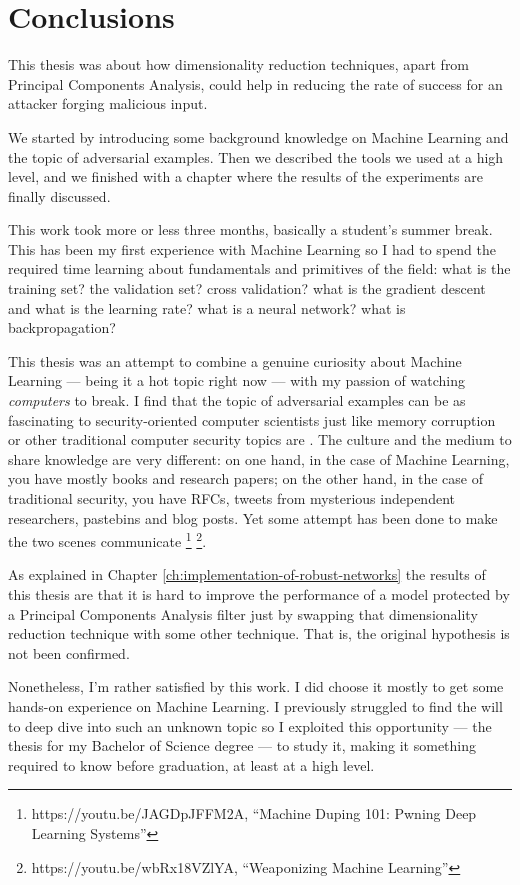 \chapter*{Conclusions}

This thesis was about how dimensionality reduction techniques, apart
from Principal Components Analysis, could help in reducing the rate of
success for an attacker forging malicious input.

We started by introducing some background knowledge on Machine Learning
and the topic of adversarial examples. Then we described the tools we
used at a high level, and we finished with a chapter where the results
of the experiments are finally discussed.

This work took more or less three months, basically a student's summer
break. This has been my first experience with Machine Learning so I had
to spend the required time learning about fundamentals and primitives
of the field: what is the training set? the validation set? cross
validation? what is the gradient descent and what is the learning rate?
what is a neural network? what is backpropagation?

This thesis was an attempt to combine a genuine curiosity about Machine
Learning --- being it a hot topic right now --- with my passion of
watching \emph{computers} to break. I find that the topic of
adversarial examples can be as fascinating to security-oriented
computer scientists just like memory corruption or other traditional
computer security topics are \cite{DBLP:journals/corr/PapernotMSW16}.
The culture and the medium to share knowledge are very different: on
one hand, in the case of Machine Learning, you have mostly books and
research papers; on the other hand, in the case of traditional
security, you have RFCs, tweets from mysterious independent
researchers, pastebins and blog posts. Yet some attempt has been done
to make the two scenes communicate%
\footnote{https://youtu.be/JAGDpJFFM2A, ``Machine Duping 101: Pwning
  Deep Learning Systems''}
\footnote{https://youtu.be/wbRx18VZlYA, ``Weaponizing Machine
  Learning''}.

As explained in Chapter \ref{ch:implementation-of-robust-networks} the
results of this thesis are that it is hard to improve the performance of
a model protected by a Principal Components Analysis filter just by
swapping that dimensionality reduction technique with some other
technique. That is, the original hypothesis is not been confirmed.

Nonetheless, I'm rather satisfied by this work. I did choose it mostly
to get some hands-on experience on Machine Learning. I previously
struggled to find the will to deep dive into such an unknown topic so I
exploited this opportunity --- the thesis for my Bachelor of Science
degree --- to study it, making it something required to know before
graduation, at least at a high level.
